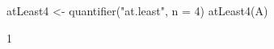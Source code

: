 \begin{Schunk}
% --begin: "quant7"
\begin{Sinput}
 atLeast4 <- quantifier("at.least", n = 4)
 atLeast4(A)
\end{Sinput}
\begin{Soutput}
[1] 1
\end{Soutput}
%
% --end: "quant7"
\end{Schunk}
